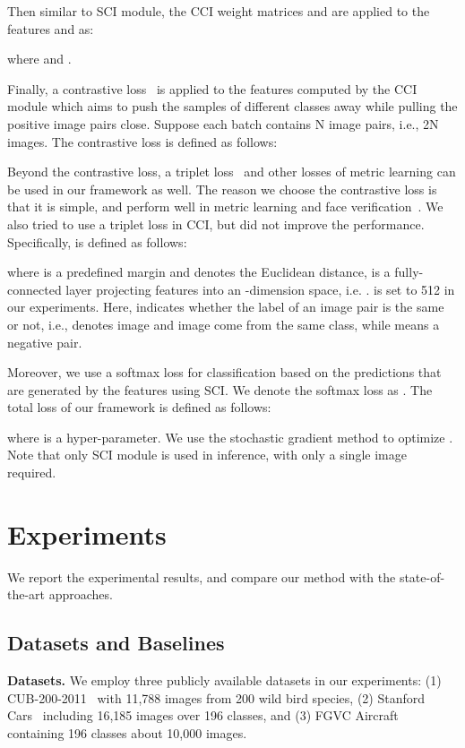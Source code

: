 \documentclass[letterpaper]{article} \usepackage{aaai20}  \usepackage{times}  \usepackage{helvet} \usepackage{courier}  \usepackage[hyphens]{url}  \usepackage{graphicx} \urlstyle{rm} \def\UrlFont{\rm}  \usepackage{graphicx}  \frenchspacing  \setlength{\pdfpagewidth}{8.5in}  \setlength{\pdfpageheight}{11in}  \usepackage{amsmath,amssymb}
\begin{document}
Then similar to SCI module, the CCI weight matrices  and  are applied to the features  and  as:

where  and .

Finally, a contrastive loss~\cite{hadsell2006dimensionality} is applied to the features computed by the CCI module which aims to push the samples of different classes away while pulling the positive image pairs close.
Suppose each batch contains N image pairs, i.e., 2N images.
The contrastive loss is defined as follows:

Beyond the contrastive loss, a triplet loss~\cite{DBLP:conf/cvpr/SchroffKP15} and other losses of metric learning can be used in our framework as well. The reason we choose the contrastive loss is that it is simple, and perform well in metric learning and face verification~\cite{DBLP:conf/cvpr/TaigmanYRW14,hadsell2006dimensionality}. We also tried to use a triplet loss in CCI, but did not improve the performance. Specifically,  is defined as follows:

where
 is a predefined margin and  denotes the Euclidean distance,  is a fully-connected layer projecting features into an -dimension space, i.e. .
 is set to 512 in our experiments.
Here,  indicates whether the label of an image pair is the same or not, i.e.,  denotes image  and image  come from the same class, while  means a negative pair.

Moreover, we use a softmax loss for classification based on the predictions that are generated by the features  using SCI.
We denote the softmax loss as .
The total loss  of our framework is defined as follows:

where  is a hyper-parameter.
We use the stochastic gradient method to optimize .
Note that only SCI module is used in inference, with only a single image required.

\section{Experiments}
We report the experimental results, and compare our method with the state-of-the-art approaches.

\subsection{Datasets and Baselines}
\label{sec:data-basline}

\noindent\textbf{Datasets.} We employ three publicly available datasets in our experiments:
(1) CUB-200-2011~\cite{wah2011caltech} with 11,788 images from 200 wild bird species,
(2) Stanford Cars~\cite{krause20133d} including 16,185 images over 196 classes,
and
(3) FGVC Aircraft~\cite{DBLP:journals/corr/MajiRKBV13} containing 196 classes about 10,000 images.
\end{document}
